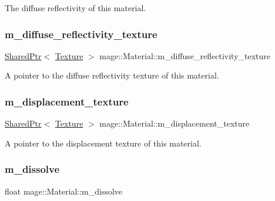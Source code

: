 The diffuse reflectivity of this material. \hypertarget{structmage_1_1_material_a5193e30d3875695c96526a85edc84b88}{}\label{structmage_1_1_material_a5193e30d3875695c96526a85edc84b88} 
\subsubsection{\texorpdfstring{m\+\_\+diffuse\+\_\+reflectivity\+\_\+texture}{m\_diffuse\_reflectivity\_texture}}
{\footnotesize\ttfamily \hyperlink{namespacemage_a1e01ae66713838a7a67d30e44c67703e}{Shared\+Ptr}$<$ \hyperlink{classmage_1_1_texture}{Texture} $>$ mage\+::\+Material\+::m\+\_\+diffuse\+\_\+reflectivity\+\_\+texture\hspace{0.3cm}{\ttfamily [private]}}

A pointer to the diffuse reflectivity texture of this material. \hypertarget{structmage_1_1_material_a04ca0a2efe12529ae0ea91e9cb622ade}{}\label{structmage_1_1_material_a04ca0a2efe12529ae0ea91e9cb622ade} 
\subsubsection{\texorpdfstring{m\+\_\+displacement\+\_\+texture}{m\_displacement\_texture}}
{\footnotesize\ttfamily \hyperlink{namespacemage_a1e01ae66713838a7a67d30e44c67703e}{Shared\+Ptr}$<$ \hyperlink{classmage_1_1_texture}{Texture} $>$ mage\+::\+Material\+::m\+\_\+displacement\+\_\+texture\hspace{0.3cm}{\ttfamily [private]}}

A pointer to the displacement texture of this material. \hypertarget{structmage_1_1_material_a42b435ea58ce7da4b48febe9bb33aba7}{}\label{structmage_1_1_material_a42b435ea58ce7da4b48febe9bb33aba7} 
\subsubsection{\texorpdfstring{m\+\_\+dissolve}{m\_dissolve}}
{\footnotesize\ttfamily float mage\+::\+Material\+::m\+\_\+dissolve\hspace{0.3cm}{\ttfamily [private]}}


